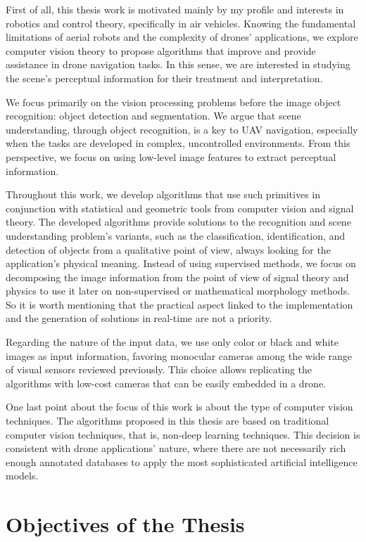 First of all, this thesis work is motivated mainly by my profile and interests in robotics and control theory, specifically in air vehicles. Knowing the fundamental limitations of aerial robots and the complexity of drones' applications, we explore computer vision theory to propose algorithms that improve and provide assistance in drone navigation tasks. In this sense, we are interested in studying the scene's perceptual information for their treatment and interpretation.

We focus primarily on the vision processing problems before the image object recognition: object detection and segmentation. We argue that scene understanding, through object recognition, is a key to UAV navigation, especially when the tasks are developed in complex, uncontrolled environments. From this perspective, we focus on using low-level image features to extract perceptual information. 


Throughout this work, we develop algorithms that use such primitives in conjunction with statistical and geometric tools from computer vision and signal theory. The developed algorithms provide solutions to the recognition and scene understanding problem's variants, such as the classification, identification, and detection of objects from a qualitative point of view, always looking for the application's physical meaning. Instead of using supervised methods, we focus on decomposing the image information from the point of view of signal theory and physics to use it later on non-supervised or mathematical morphology methods. So it is worth mentioning that the practical aspect linked to the implementation and the generation of solutions in real-time are not a priority.

Regarding the nature of the input data, we use only color or black and white images as input information, favoring monocular cameras among the wide range of visual sensors reviewed previously. This choice allows replicating the algorithms with low-cost cameras that can be easily embedded in a drone.

One last point about the focus of this work is about the type of computer vision techniques. The algorithms proposed in this thesis are based on traditional computer vision techniques, that is, non-deep learning techniques. This decision is consistent with drone applications' nature, where there are not necessarily rich enough annotated databases to apply the most sophisticated artificial intelligence models.

\section*{Objectives of the Thesis}\label{sec:objectives_of_the_thesis}

